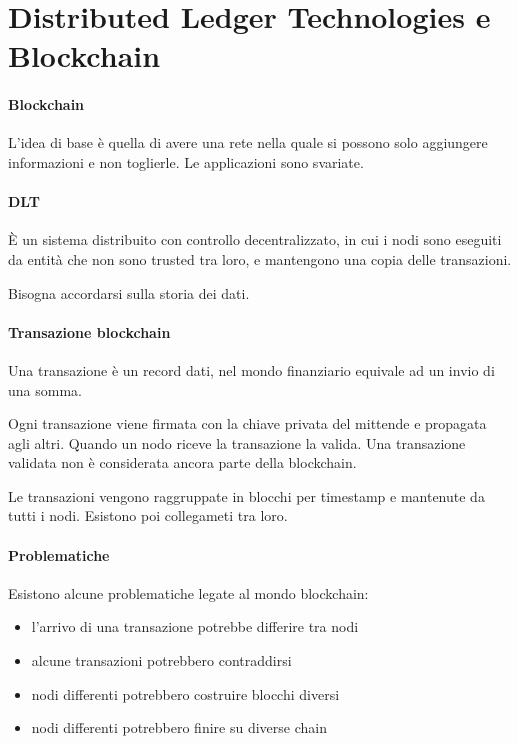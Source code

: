 \section{Distributed Ledger Technologies e Blockchain}

\paragraph{Blockchain}
L'idea di base è quella di avere una rete nella quale 
si possono solo aggiungere informazioni e non toglierle. 
Le applicazioni sono svariate.

\paragraph{DLT}
È un sistema distribuito con controllo decentralizzato, in cui i 
nodi sono eseguiti da entità che non sono trusted tra loro, 
e mantengono una copia delle transazioni.

Bisogna accordarsi sulla storia dei dati.

\paragraph{Transazione blockchain}
Una transazione è un record dati, nel mondo finanziario
equivale ad un invio di una somma.

Ogni transazione viene firmata con la chiave privata del mittende e propagata 
agli altri. 
Quando un nodo riceve la transazione la valida. Una transazione validata non 
è considerata ancora parte della blockchain.

Le transazioni vengono raggruppate in blocchi per timestamp e mantenute 
da tutti i nodi. Esistono poi collegameti tra loro.

\paragraph{Problematiche}
Esistono alcune problematiche legate al mondo blockchain:
\begin{itemize}
    \item l'arrivo di una transazione potrebbe differire tra nodi
    \item alcune transazioni potrebbero contraddirsi
    \item nodi differenti potrebbero costruire blocchi diversi
    \item nodi differenti potrebbero finire su diverse chain
\end{itemize}

